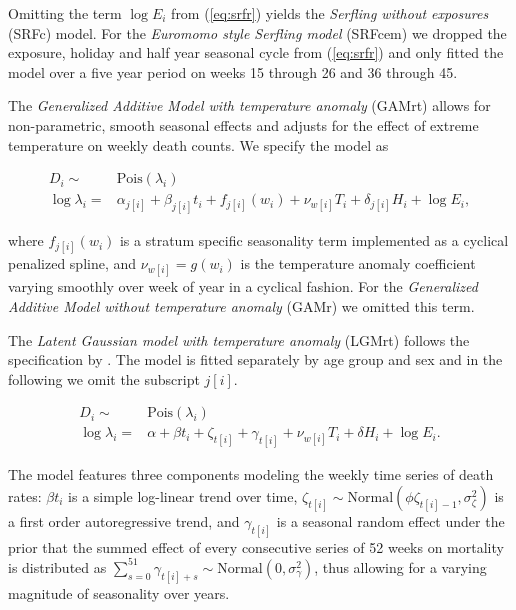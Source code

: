 \documentclass[12pt]{article}
\begin{document}
\begin{appendix}
Omitting the term $\log E_i$ from (\ref{eq:srfr}) yields the \emph{Serfling without exposures} (SRFc) model. For the \emph{Euromomo style Serfling model} (SRFcem) we dropped the exposure, holiday and half year seasonal cycle from (\ref{eq:srfr}) and only fitted the model over a five year period on weeks 15 through 26 and 36 through 45.

The \emph{Generalized Additive Model with temperature anomaly} (GAMrt) allows for non-parametric, smooth seasonal effects and adjusts for the effect of extreme temperature on weekly death counts. We specify the model as

\begin{equation}
  \begin{aligned}
    D_i \sim& \text{Pois}(\lambda_i) \\
    \log \lambda_i =& \alpha_{j[i]} + \beta_{j[i]}t_i + f_{j[i]}(w_i) + \nu_{w[i]} T_i + \delta_{j[i]}H_i + \log E_i,
  \end{aligned}
  \label{eq:gamrt}
\end{equation}

where $f_{j[i]}(w_i)$ is a stratum specific seasonality term implemented as a cyclical penalized spline, and $\nu_{w[i]}=g(w_i)$ is the temperature anomaly coefficient varying smoothly over week of year in a cyclical fashion. For the \emph{Generalized Additive Model without temperature anomaly} (GAMr) we omitted this term.

The \emph{Latent Gaussian model with temperature anomaly} (LGMrt) follows the specification by \cite{Kontis2020}. The model is fitted separately by age group and sex and in the following we omit the subscript $j[i]$.

\begin{equation}
  \begin{aligned}
    D_i \sim& \text{Pois}(\lambda_i) \\
    \log \lambda_i =& \alpha + \beta t_i +
    \zeta_{t[i]} + \gamma_{t[i]} +
    \nu_{w[i]} T_i + \delta H_i + \log E_i.
  \end{aligned}
  \label{eq:lgmrt}
\end{equation}

The model features three components modeling the weekly time series of death rates: $\beta t_i$ is a simple log-linear trend over time, $\zeta_{t[i]} \sim \text{Normal}(\phi \zeta_{t[i]-1}, \sigma^2_\zeta)$ is a first order autoregressive trend, and $\gamma_{t[i]}$ is a seasonal random effect under the prior that the summed effect of every consecutive series of 52 weeks on mortality is distributed as $\sum_{s=0}^{51} \gamma_{t[i]+s} \sim \text{Normal}(0, \sigma^2_\gamma)$, thus allowing for a varying magnitude of seasonality over years.


\end{appendix}
\end{document}
